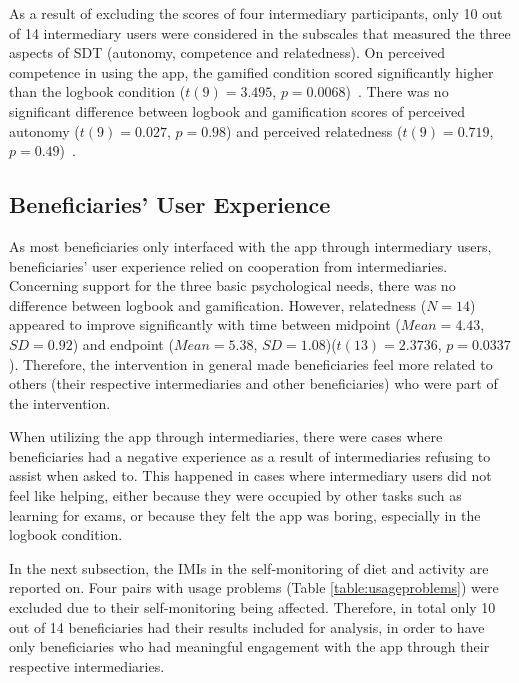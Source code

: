 As a result of excluding the scores of four intermediary participants, only 10 out of 14 intermediary users were considered in the subscales that measured the three aspects of SDT (autonomy, competence and relatedness). On perceived competence in using the app, the gamified condition scored significantly higher than the logbook condition ($t(9)=3.495$, $p=0.0068$)~\citep{katule2016family}. There was no significant difference between logbook and gamification scores of perceived autonomy ($t(9)=0.027$, $p=0.98$) and perceived relatedness ($t(9)=0.719$, $p=0.49$)~\citep{katule2016family}.

\subsection{Beneficiaries' User Experience}\label{ben_user_xp}
As most beneficiaries only interfaced with the app through intermediary users, beneficiaries' user experience relied on cooperation from intermediaries. Concerning support for the three basic psychological needs, there was no difference between logbook and gamification. However, relatedness ($N=14$) appeared to improve significantly with time between midpoint ($Mean=4.43$, $SD=0.92$) and endpoint ($Mean=5.38$, $SD=1.08$)($t(13)=2.3736$, $p=0.0337$). Therefore, the intervention in general made beneficiaries feel more related to others (their respective intermediaries and other beneficiaries) who were part of the intervention.
  
When utilizing the app through intermediaries, there were cases where beneficiaries had a negative experience as a result of intermediaries refusing to assist when asked to. This happened in cases where intermediary users did not feel like helping, either because they were occupied by other tasks such as learning for exams, or because they felt the app was boring, especially in the logbook condition. 

In the next subsection, the IMIs in the self-monitoring of diet and activity are reported on. Four pairs with usage problems (Table \ref{table:usageproblems}) were excluded due to their self-monitoring being affected. Therefore, in total only 10 out of 14 beneficiaries had their results included for analysis, in order to have only beneficiaries who had meaningful engagement with the app through their respective intermediaries.
